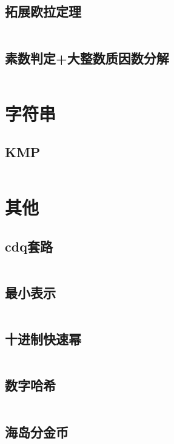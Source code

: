 \documentclass{article}
\begin{document}
\subsection{拓展欧拉定理}
\inputminted[breaklines]{c++}{../数学/拓展欧拉定理.cpp}

\subsection{素数判定+大整数质因数分解}
\inputminted[breaklines]{c++}{../数学/素数判定+大整数质因数分解.cpp}

\newpage
\section{字符串}
\subsection{KMP}
\inputminted[breaklines]{c++}{../字符串/KMP.cpp}

\newpage
\section{其他}

\subsection{cdq套路}
\inputminted[breaklines]{text}{../其他/cdq.cpp}

\subsection{最小表示}
\inputminted[breaklines]{c++}{../其他/最小表示.cpp}

\subsection{十进制快速幂}
\inputminted[breaklines]{c++}{../其他/十进制快速幂.cpp}

\subsection{数字哈希}
\inputminted[breaklines]{c++}{../其他/数字哈希.cpp}

\subsection{海岛分金币}
\end{document}
